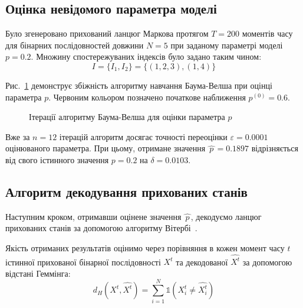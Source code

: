 \documentclass[]{iptconf}
\theoremstyle{plain}
\begin{document}
\subsection*{Оцінка невідомого параметра моделі}

Було згенеровано прихований ланцюг Маркова протягом $T=200$ моментів часу для бінарних послідовностей довжини $N=5$ при заданому параметрі моделі $p=0.2$. Множину спостережуваних індексів було задано таким чином:
\begin{equation}\label{eq: example observed indexes}
    I=\{I_1,I_2\}=\{(1,2,3),(1,4)\}
\end{equation} 

Рис.~\ref{pic: p baum-welch learning algorithm} демонструє збіжність алгоритму навчання Баума-Велша при оцінці параметра $p$. Червоним кольором позначено початкове наближення $p^{(0)}=0.6$.
\begin{figure}[H]\centering
    \caption{Ітерації алгоритму Баума-Велша для оцінки параметра $p$}
    \label{pic: p baum-welch learning algorithm}
\end{figure}

Вже за $n=12$ ітерацій алгоритм досягає точності переоцінки $\varepsilon=0.0001$ оцінюваного параметра. При цьому, отримане значення $\widehat{\,p\,}=0.1897$ відрізняється від свого істинного значення $p=0.2$ на $\delta=0.0103$.

\subsection*{Алгоритм декодування прихованих станів}

Наступним кроком, отримавши оцінене значення $\widehat{\,p\,}$, декодуємо ланцюг прихованих станів за допомогою алгоритму Вітербі~\cite[розділ 6]{Nilsson2005}. 

Якість отриманих результатів оцінимо через порівняння в кожен момент часу $t$ істинної прихованої бінарної послідовності $X^t$ та декодованої $\widehat{X^t}$ за допомогою відстані Геммінга:
\begin{equation*}
    d_H\left( X^t,\widehat{X^t} \right) = \sum_{i=1}^{N} \mathbb{1}\left( X^t_i \neq \widehat{X^t_i} \right)
\end{equation*} 
\end{document}
